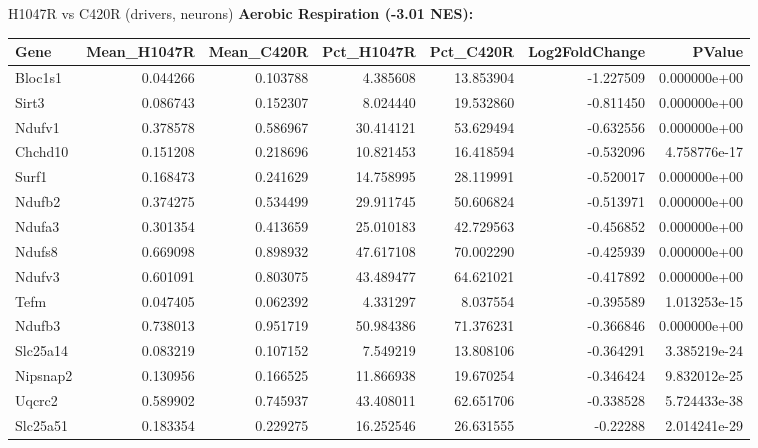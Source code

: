 \documentclass[10pt, aspectratio=169]{beamer}
\begin{document}
\begin{frame}{H1047R vs C420R (drivers, neurons)}
  \centering
  {\small \textbf{Aerobic Respiration (-3.01 NES):}}\par
  \vspace{0.15cm}
  \tiny
  \begin{tabular}{l r r r r r r}
    \toprule
    \textbf{Gene} & \textbf{Mean\_H1047R} & \textbf{Mean\_C420R} & \textbf{Pct\_H1047R} & \textbf{Pct\_C420R} & \textbf{Log2FoldChange} & \textbf{PValue} \\
    \midrule
    Bloc1s1 & 0.044266 & 0.103788 & 4.385608 & 13.853904 & -1.227509 & 0.000000e+00 \\
    Sirt3 & 0.086743 & 0.152307 & 8.024440 & 19.532860 & -0.811450 & 0.000000e+00 \\
    Ndufv1 & 0.378578 & 0.586967 & 30.414121 & 53.629494 & -0.632556 & 0.000000e+00 \\
    Chchd10 & 0.151208 & 0.218696 & 10.821453 & 16.418594 & -0.532096 & 4.758776e-17 \\
    Surf1 & 0.168473 & 0.241629 & 14.758995 & 28.119991 & -0.520017 & 0.000000e+00 \\
    Ndufb2 & 0.374275 & 0.534499 & 29.911745 & 50.606824 & -0.513971 & 0.000000e+00 \\
    Ndufa3 & 0.301354 & 0.413659 & 25.010183 & 42.729563 & -0.456852 & 0.000000e+00 \\
    Ndufs8 & 0.669098 & 0.898932 & 47.617108 & 70.002290 & -0.425939 & 0.000000e+00 \\
    Ndufv3 & 0.601091 & 0.803075 & 43.489477 & 64.621021 & -0.417892 & 0.000000e+00 \\
    Tefm & 0.047405 & 0.062392 & 4.331297 & 8.037554 & -0.395589 & 1.013253e-15 \\
    Ndufb3 & 0.738013 & 0.951719 & 50.984386 & 71.376231 & -0.366846 & 0.000000e+00 \\
    Slc25a14 & 0.083219 & 0.107152 & 7.549219 & 13.808106 & -0.364291 & 3.385219e-24 \\
    Nipsnap2 & 0.130956 & 0.166525 & 11.866938 & 19.670254 & -0.346424 & 9.832012e-25 \\
    Uqcrc2 & 0.589902 & 0.745937 & 43.408011 & 62.651706 & -0.338528 & 5.724433e-38 \\
    Slc25a51 & 0.183354 & 0.229275 & 16.252546 & 26.631555 & -0.22288 & 2.014241e-29 \\

\end{tabular}
\end{frame}
\end{document}
